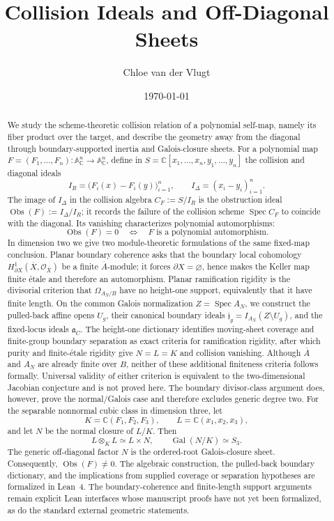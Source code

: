 \documentclass[11pt]{article}
\title{Collision Ideals and Off-Diagonal Sheets}
\author{Chloe van der Vlugt}
\date{\today}
\theoremstyle{remark}
\theoremstyle{definition}
\DeclareMathOperator{\Spec}{Spec}
\DeclareMathOperator{\Gal}{Gal}
\newcommand{\A}{\mathbb A}
\newcommand{\C}{\mathbb C}
\newcommand{\Obs}{\operatorname{Obs}}
\begin{document}
\maketitle

\begin{abstract}
We study the scheme-theoretic collision relation of a polynomial self-map,
namely its fiber product over the target, and describe the geometry away
from the diagonal through boundary-supported inertia and Galois-closure
sheets.
For a polynomial map
\(F=(F_1,\dots,F_n)\colon\A^n_{\C}\to\A^n_{\C}\), define in
\(S=\C[x_1,\dots,x_n,y_1,\dots,y_n]\) the collision and diagonal ideals
\[
  I_R=\bigl(F_i(x)-F_i(y)\bigr)_{i=1}^n,
  \qquad
  I_\Delta=(x_i-y_i)_{i=1}^n.
\]
The image of \(I_\Delta\) in the collision algebra \(C_F:=S/I_R\) is the
obstruction ideal
\(\Obs(F):=I_\Delta/I_R\); it records the failure of the collision scheme
\(\Spec C_F\) to coincide with the diagonal.  Its vanishing characterizes
polynomial automorphisms:
\[
  \Obs(F)=0
  \quad\Longleftrightarrow\quad
  F\text{ is a polynomial automorphism}.
\]
In dimension two we give two module-theoretic formulations of the same
fixed-map conclusion.  Planar boundary coherence asks that the boundary
local cohomology
\(H^1_{\partial X}(\overline X,\mathcal O_{\overline X})\) be a finite
\(\overline A\)-module; it forces \(\partial X=\varnothing\), hence makes
the Keller map finite \'etale and therefore an automorphism.  Planar
ramification rigidity is the divisorial criterion that
\(\Omega_{A_N/B}\) have no height-one support, equivalently that it have
finite length.  On the common Galois normalization \(Z=\Spec A_N\), we
construct the pulled-back
affine opens \(U_g\), their canonical boundary ideals
\(\mathfrak j_g=I_{A_N}(Z\setminus U_g)\), and the fixed-locus ideals
\(\mathfrak a_C\).  The height-one dictionary identifies moving-sheet
coverage and finite-group boundary separation as exact criteria for
ramification rigidity, after which purity and finite-\'etale rigidity give
\(N=L=K\) and collision vanishing.  Although \(\overline A\) and \(A_N\)
are already finite over \(B\), neither of these additional finiteness
criteria follows formally.  Universal validity of either criterion is
equivalent to the two-dimensional Jacobian conjecture and is not proved
here.  The boundary divisor-class argument does, however, prove the
normal/Galois case and therefore excludes generic degree two.
For the separable nonnormal cubic class in dimension three, let
\[
  K=\C(F_1,F_2,F_3),
  \qquad
  L=\C(x_1,x_2,x_3),
\]
and let \(N\) be the normal closure of \(L/K\).  Then
\[
  L\otimes_K L\simeq L\times N,
  \qquad
  \Gal(N/K)\simeq S_3.
\]
The generic off-diagonal factor \(N\) is the ordered-root Galois-closure sheet.
Consequently, \(\Obs(F)\neq0\).  The algebraic construction, the
pulled-back boundary dictionary, and the implications from supplied
coverage or separation hypotheses are formalized in Lean~4.  The
boundary-coherence and finite-length support arguments remain explicit
Lean interfaces whose manuscript proofs have not yet been formalized, as
do the standard external geometric statements.
\end{abstract}
\end{document}
